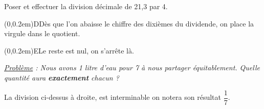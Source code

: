 \begin{changemargin}{0mm}{-15mm}
\begin{methode*1}
        \begin{minipage}{0.45\linewidth}
            Poser et effectuer la division décimale de 21,3 par 4.\par \vspace{0.5cm}
            \begin{center}
            \qquad
            \begin{minipage}[c]{3cm}
                \pnode(0,0.2em){D}{Dès que l'on abaisse le chiffre des dixièmes du dividende, on place la virgule dans le quotient.}
                \par
                \par
                \par
                \pnode(0,0.2em){E}{Le reste est nul, on s'arrête là.}
                \par
            \end{minipage}
            \end{center}
        \end{minipage}
        \hfill
        \begin{minipage}{0.65\linewidth}
            \begin{remarque}
                
                \textit{\underline{Problème} : Nous avons 1 litre d'eau pour 7 à nous partager \'equitablement. Quelle quantit\'e aura \textbf{exactement} chacun ?}\\
                \begin{center}
                \end{center}
            \end{remarque}
        \end{minipage}
    \end{methode*1}
    
    \begin{remarque}
        La division ci-dessus à droite, est interminable on notera son r\'esultat $\dfrac{1}{7}$. 
    \end{remarque}
\end{changemargin}
 

